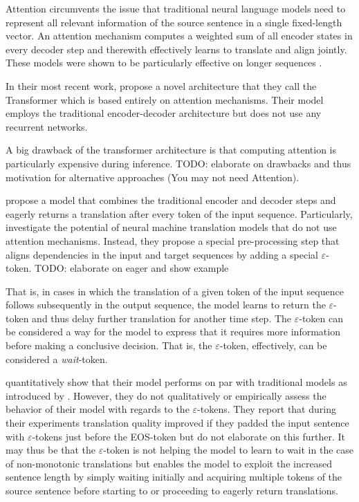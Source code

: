 \documentclass[english]{uzhpub}
\begin{document}
Attention circumvents the issue that traditional neural language models need to represent all relevant information of the source sentence in a single fixed-length vector. An attention mechanism computes a weighted sum of all encoder states in every decoder step and therewith effectively learns to translate and align jointly. These models were shown to be particularly effective on longer sequences \cite{jointly.bahdanau2014neural,effective.luong2015effective}.

In their most recent work, \cite{attentionisallyouneed} propose a novel architecture that they call the Transformer which is based entirely on attention mechanisms. Their model employs the traditional encoder-decoder architecture but does not use any recurrent networks.

A big drawback of the transformer architecture is that computing attention is particularly expensive during inference. TODO: elaborate on drawbacks and thus motivation for alternative approaches (You may not need Attention).

\cite{youmaynotneedattention} propose a model that combines the traditional encoder and decoder steps and eagerly returns a translation after every token of the input sequence. Particularly, \cite{youmaynotneedattention} investigate the potential of neural machine translation models that do not use attention mechanisms.
Instead, they propose a special pre-processing step that aligns dependencies in the input and target sequences by adding a special $\varepsilon$-token. TODO: elaborate on eager and show example

That is, in cases in which the translation of a given token of the input sequence follows subsequently in the output sequence, the model learns to return the $\varepsilon$-token and thus delay further translation for another time step. The $\varepsilon$-token can be considered a way for the model to express that it requires more information before making a conclusive decision. That is, the $\varepsilon$-token, effectively, can be considered a \textit{wait}-token.

\cite{youmaynotneedattention} quantitatively show that their model performs on par with traditional models as introduced by \cite{jointly.bahdanau2014neural}. However, they do not qualitatively or empirically assess the behavior of their model with regards to the $\varepsilon$-tokens. They report that during their experiments translation quality improved if they padded the input sentence with $\varepsilon$-tokens just before the EOS-token but do not elaborate on this further. It may thus be that the $\varepsilon$-token is not helping the model to learn to wait in the case of non-monotonic translations but enables the model to exploit the increased sentence length by simply waiting initially and acquiring multiple tokens of the source sentence before starting to or proceeding to eagerly return translations.
\end{document}
